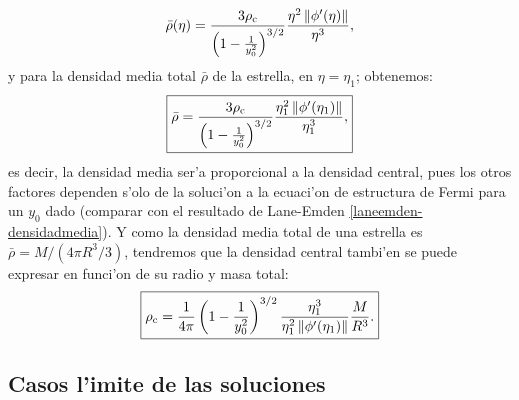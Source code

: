 \begin{align}
\bar{\rho}(\eta)=\frac{3\rho_{\rm c}}{\left(1-\frac{1}{y_0^2}\right)^{3/2}}\frac{\eta^2\left\Vert\phi'(\eta)\right\Vert}{\eta^3},
\end{align}
y para la densidad media total $\bar{\rho}$ de la estrella, en $\eta=\eta_1$; obtenemos:
\begin{align}\label{ec-fermi-densidadmediaycentral}
\boxed{\bar{\rho}=\frac{3\rho_{\rm c}}{\left(1-\frac{1}{y_0^2}\right)^{3/2}}\frac{\eta_1^2\left\Vert\phi'(\eta_1)\right\Vert}{\eta_1^3},}
\end{align}
es decir, la densidad media ser'a proporcional a la densidad central, pues los otros factores dependen s'olo de la soluci'on a la ecuaci'on de estructura de Fermi para un $y_0$ dado (comparar con el resultado de Lane-Emden \eqref{laneemden-densidadmedia}). Y como la densidad media total de una estrella es $\bar{\rho}=M/(4\pi R^3/3)$, tendremos que la densidad central tambi'en se puede expresar en funci'on de su radio y masa total:
\begin{equation}
\boxed{ \rho_{\rm c}= \frac{1}{4\pi}\left(1-\frac{1}{y_0^2}\right)^{3/2}\frac{\eta_1^3}{\eta_1^2\left\Vert\phi'(\eta_1)\right\Vert}\frac{M}{R^3}.}
\end{equation}



\subsection{Casos l'imite de las soluciones}\label{sec:ec-fermi-limites}

